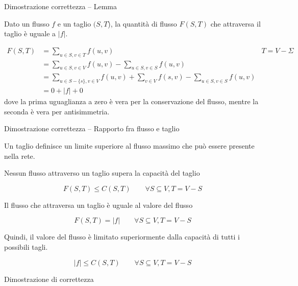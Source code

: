 \begin{frame}{Dimostrazione correttezza -- Lemma    }
    
\vspace{-12pt}
\begin{lemma}
Dato un flusso $f$ e un taglio $(S,T$), la quantità di flusso
$F(S,T)$ che attraversa il taglio è uguale a $|f|$.
\end{lemma}

\begin{align*}
F(S,T) &= \sum_{u \in S, v \in T} f(u,v) & T = V - \Sigma\\
       &= \sum_{u \in S, v \in V} f(u,v) - \sum_{u \in S, v \in S} f(u,v) \\ 
       &= \sum_{u \in S-\{s\}, v \in V} f(u,v) + \sum_{v \in V} f(s,v) - \sum_{u \in S, v \in S} f(u,v) \\ 
       &= 0 + |f| + 0
\end{align*}
dove la prima uguaglianza a zero è vera per la conservazione del
flusso, mentre la seconda è vera per antisimmetria.
        
\end{frame}

\begin{frame}{Dimostrazione correttezza -- Rapporto fra flusso e taglio}

Un taglio definisce un limite superiore al flusso massimo che può
essere presente nella rete. 
\BIL
\item Nessun flusso attraverso un taglio supera la capacità del taglio

\[
  F(S,T) \leq C(S,T) \qquad \forall S \subseteq V, T = V-S
\]
\item Il flusso che attraversa un taglio è uguale al valore del flusso

\[
  F(S,T) = |f| \qquad \forall S \subseteq V, T = V-S
\]
\item Quindi, il valore del flusso è limitato superiormente dalla capacità
di tutti i possibili tagli. 

\[
|f| \leq C(S,T) \qquad \forall S \subseteq V, T = V-S
\]
\EIL

\end{frame}

\begin{frame}{Dimostrazione di correttezza}


\end{frame}

